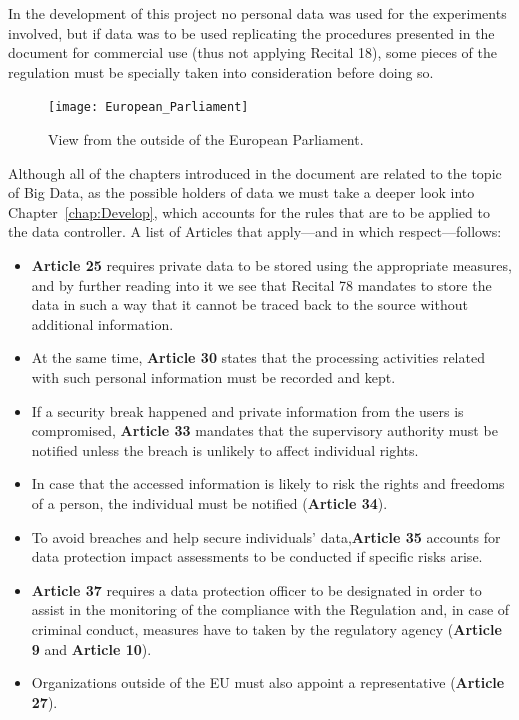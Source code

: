 In the development of this project no personal data was used for the experiments involved, but if data was to be used replicating the procedures presented in the document for commercial use (thus not applying Recital 18), some pieces of the regulation must be specially taken into consideration before doing so. %
\begin{figure}[H]
	\caption{View from the outside of the European Parliament.}
	\label{fig:European_Parliament}
	\texttt{[image: European\_Parliament]}
\end{figure}

Although all of the chapters introduced in the document are related to the topic of Big Data, as the possible holders of data we must take a deeper look into Chapter~\ref{chap:Develop}, which accounts for the rules that are to be applied to the data controller. 
%
A list  of Articles that apply---and in which respect---follows:
%
\begin{itemize}
\item \textbf{Article 25} requires private data to be stored using the appropriate measures, and by further reading into it we see that Recital 78 mandates to store the data in such a way that it cannot be traced back to the source without additional information.

\item At the same time, \textbf{Article 30} states that the processing activities related with such personal information must be recorded and kept. 

\item  If a security break happened and private information from the users is compromised, \textbf{Article 33} mandates that the supervisory authority must be notified unless the breach is unlikely to affect individual rights. 

\item In case that the accessed information is likely to risk the rights and freedoms of a person, the individual must be notified (\textbf{Article 34}).

\item To avoid breaches and help secure individuals' data,\textbf{Article 35} accounts for data protection impact assessments to be conducted if specific risks arise.

\item \textbf{Article 37} requires a data protection officer to be designated in order to assist in the monitoring of the compliance with the Regulation and, in case of criminal conduct, measures have to taken by the regulatory agency (\textbf{Article 9} and \textbf{Article 10}).

\item  Organizations outside of the EU must also appoint a representative (\textbf{Article 27}).

\end{itemize}  





